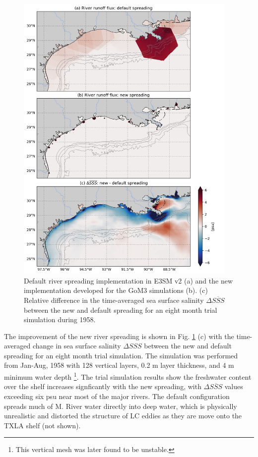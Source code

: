 \begin{figure}
\centerline{\includegraphics[width=0.95\textwidth]{figures/scgsr/spreading_comp.jpg}}
    \caption{Default river spreading implementation in E3SM v2 (a) and the new implementation developed for the GoM3 simulations (b). (c) Relative difference in the time-averaged sea surface salinity $\Delta \overline{SSS}$ between the new and default spreading for an eight month trial simulation during 1958.}
    \label{fig:spreading}
\end{figure}

The improvement of the new river spreading is shown in Fig. \ref{fig:spreading} (c) with the time-averaged change in sea surface salinity $\Delta SSS$ between the new and default spreading for an eight month trial simulation. The simulation was performed from Jan-Aug, 1958 with 128 vertical layers, 0.2 m layer thickness, and 4 m minimum water depth \footnote{This vertical mesh was later found to be unstable.}. The trial simulation results show the freshwater content over the shelf increases signficantly with the new spreading, with $\Delta \overline{SSS}$ values exceeding six psu near most of the major rivers. The default configuration spreads much of M. River water directly into deep water, which is physically unrealistic and distorted the structure of LC eddies as they are move onto the TXLA shelf (not shown). 

